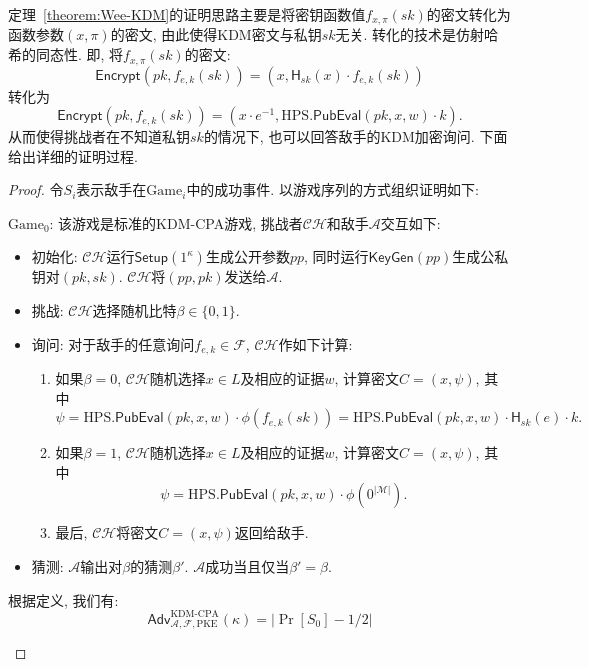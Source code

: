 定理~\ref{theorem:Wee-KDM}的证明思路主要是将密钥函数值$f_{x, \pi}(sk)$的密文转化为函数参数$(x, \pi)$的密文, 由此使得KDM密文与私钥$sk$无关. 转化的技术是仿射哈希的同态性. 即, 将$f_{x, \pi}(sk)$的密文:
\[
\mathsf{Encrypt}(pk, f_{e, k}(sk)) = (x,\mathsf{H}_{sk}(x) \cdot f_{e, k}(sk))
\]
转化为
\begin{equation}\label{eq:kem-CT}
\mathsf{Encrypt}(pk, f_{e, k}(sk)) = (x \cdot e^{-1},\text{HPS}.\mathsf{PubEval}(pk, x, w) \cdot k).
\end{equation}
从而使得挑战者在不知道私钥$sk$的情况下, 也可以回答敌手的KDM加密询问. 下面给出详细的证明过程.
\begin{proof}
令$S_i$表示敌手在$\text{Game}_i$中的成功事件. 以游戏序列的方式组织证明如下: 
\begin{trivlist}
\item $\text{Game}_0$: 该游戏是标准的KDM-CPA游戏, 挑战者$\mathcal{CH}$和敌手$\mathcal{A}$交互如下: 
\begin{itemize}
\item 初始化: $\mathcal{CH}$运行$\mathsf{Setup}(1^\kappa)$生成公开参数$pp$, 
		同时运行$\mathsf{KeyGen}(pp)$生成公私钥对$(pk, sk)$. $\mathcal{CH}$将$(pp, pk)$发送给$\mathcal{A}$. 

\item 挑战: $\mathcal{CH}$选择随机比特$\beta \in \{0,1\}$.

\item 询问: 对于敌手的任意询问$f_{e, k} \in \mathcal{F}$, $\mathcal{CH}$作如下计算: 
\begin{enumerate}
    \item 如果$\beta = 0$, $\mathcal{CH}$随机选择$x \in L$及相应的证据$w$, 计算密文$C = (x, \psi)$, 其中
\[
\psi = \text{HPS}.\mathsf{PubEval}(pk, x, w) \cdot \phi(f_{e, k}(sk)) = \text{HPS}.\mathsf{PubEval}(pk, x, w) \cdot \mathsf{H}_{sk}(e)\cdot k.
\]
    \item 如果$\beta = 1$, $\mathcal{CH}$随机选择$x \in L$及相应的证据$w$, 计算密文$C = (x, \psi)$, 其中
\[
\psi = \text{HPS}.\mathsf{PubEval}(pk, x, w) \cdot \phi(0^{|\mathcal{M}|}).
\]
    \item 最后, $\mathcal{CH}$将密文$C = (x, \psi)$返回给敌手. 
\end{enumerate} 

\item 猜测: $\mathcal{A}$输出对$\beta$的猜测$\beta'$. $\mathcal{A}$成功当且仅当$\beta' = \beta$. 
\end{itemize} 
根据定义, 我们有: 
\begin{equation*}
	\mathsf{Adv}_{\mathcal{A}, \mathcal{F}, \text{PKE}}^{\text{KDM-CPA}}(\kappa) = |\Pr[S_0] - 1/2|
\end{equation*}


\end{trivlist}
\end{proof}
